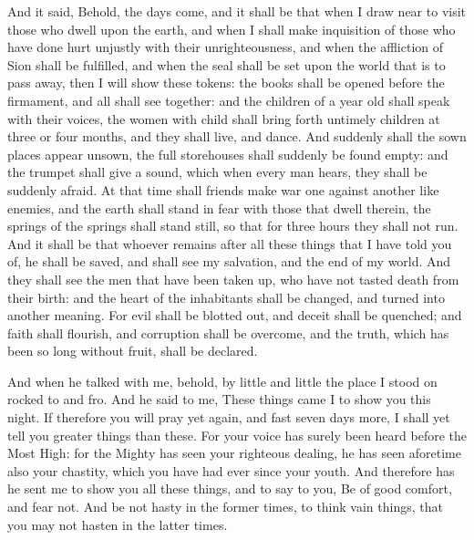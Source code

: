 {And it said, Behold, the days come, and it shall be that when I draw near to visit those who dwell upon the earth,
and when I shall make inquisition of those who have done hurt unjustly with their unrighteousness, and when the affliction of Sion shall be fulfilled,
and when the seal shall be set upon the world that is to pass away, then I will show these tokens: the books shall be opened before the firmament, and all shall see together:
and the children of a year old shall speak with their voices, the women with child shall bring forth untimely children at three or four months, and they shall live, and dance.
And suddenly shall the sown places appear unsown, the full storehouses shall suddenly be found empty:
and the trumpet shall give a sound, which when every man hears, they shall be suddenly afraid.
At that time shall friends make war one against another like enemies, and the earth shall stand in fear with those that dwell therein, the springs of the springs shall stand still, so that for three hours they shall not run.
And it shall be that whoever remains after all these things that I have told you of, he shall be saved, and shall see my salvation, and the end of my world.
And they shall see the men that have been taken up, who have not tasted death from their birth: and the heart of the inhabitants shall be changed, and turned into another meaning.
For evil shall be blotted out, and deceit shall be quenched;
and faith shall flourish, and corruption shall be overcome, and the truth, which has been so long without fruit, shall be declared.
\par }{\PP {}And when he talked with me, behold, by little and little the place I stood on rocked to and fro.
And he said to me, These things came I to show you
 this night.
If therefore you will pray yet again, and fast seven days more, I shall yet
 tell you greater things than these.
For your voice has surely been heard before the Most High: for the Mighty has seen your righteous dealing, he has seen aforetime also your chastity, which you have had ever since your youth.
And therefore has he sent me to show you all these things, and to say to you, Be of good comfort, and fear not.
And be not hasty in
{} the former times, to think vain things, that you may not hasten in the latter times.
}

